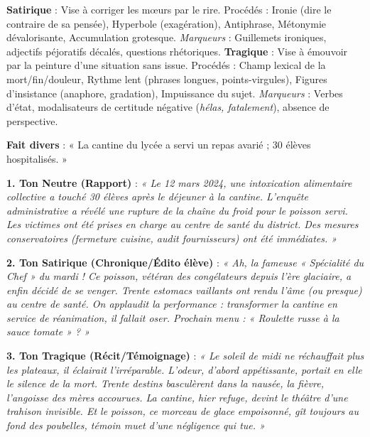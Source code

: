 \documentclass[11pt]{article}
\begin{document}
\begin{definition}
\textbf{Satirique} : Vise à corriger les mœurs par le rire. Procédés : Ironie (dire le contraire de sa pensée), Hyperbole (exagération), Antiphrase, Métonymie dévalorisante, Accumulation grotesque. \emph{Marqueurs} : Guillemets ironiques, adjectifs péjoratifs décalés, questions rhétoriques.
\textbf{Tragique} : Vise à émouvoir par la peinture d'une situation sans issue. Procédés : Champ lexical de la mort/fin/douleur, Rythme lent (phrases longues, points-virgules), Figures d'insistance (anaphore, gradation), Impuissance du sujet. \emph{Marqueurs} : Verbes d'état, modalisateurs de certitude négative (\emph{hélas, fatalement}), absence de perspective.
\end{definition}

\begin{exemplebox}
\textbf{Fait divers} : « La cantine du lycée a servi un repas avarié ; 30 élèves hospitalisés. »

\textbf{1. Ton Neutre (Rapport)} :
\emph{« Le 12 mars 2024, une intoxication alimentaire collective a touché 30 élèves après le déjeuner à la cantine. L'enquête administrative a révélé une rupture de la chaîne du froid pour le poisson servi. Les victimes ont été prises en charge au centre de santé du district. Des mesures conservatoires (fermeture cuisine, audit fournisseurs) ont été immédiates. »}

\textbf{2. Ton Satirique (Chronique/Édito élève)} :
\emph{« Ah, la fameuse « Spécialité du Chef » du mardi ! Ce poisson, vétéran des congélateurs depuis l'ère glaciaire, a enfin décidé de se venger. Trente estomacs vaillants ont rendu l'âme (ou presque) au centre de santé. On applaudit la performance : transformer la cantine en service de réanimation, il fallait oser. Prochain menu : « Roulette russe à la sauce tomate » ? »}

\textbf{3. Ton Tragique (Récit/Témoignage)} :
\emph{« Le soleil de midi ne réchauffait plus les plateaux, il éclairait l'irréparable. L'odeur, d'abord appétissante, portait en elle le silence de la mort. Trente destins basculèrent dans la nausée, la fièvre, l'angoisse des mères accourues. La cantine, hier refuge, devint le théâtre d'une trahison invisible. Et le poisson, ce morceau de glace empoisonné, gît toujours au fond des poubelles, témoin muet d'une négligence qui tue. »}
\end{exemplebox}
\end{document}

